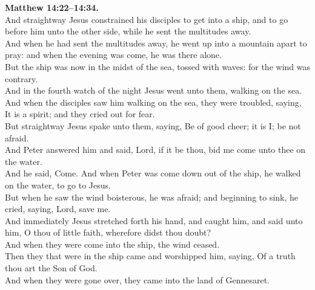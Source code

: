 \documentclass[10pt]{article} %
\begin{document}
{\begin{minipage}[t]{0.45\textwidth}
\textbf{Matthew 14:22--14:34.}\\
And straightway Jesus constrained his disciples to get into a ship, and to go before him unto the other side, while he sent the multitudes away.\\
And when he had sent the multitudes away, he went up into a mountain apart to pray: and when the evening was come, he was there alone.\\
But the ship was now in the midst of the sea, tossed with waves: for the wind was contrary.\\
And in the fourth watch of the night Jesus went unto them, walking on the sea.\\
And when the disciples saw him walking on the sea, they were troubled, saying, It is a spirit; and they cried out for fear.\\
But straightway Jesus spake unto them, saying, Be of good cheer; it is I; be not afraid.\\
And Peter answered him and said, Lord, if it be thou, bid me come unto thee on the water.\\
And he said, Come. And when Peter was come down out of the ship, he walked on the water, to go to Jesus.\\
But when he saw the wind boisterous, he was afraid; and beginning to sink, he cried, saying, Lord, save me.\\
And immediately Jesus stretched forth his hand, and caught him, and said unto him, O thou of little faith, wherefore didst thou doubt?\\
And when they were come into the ship, the wind ceased.\\
Then they that were in the ship came and worshipped him, saying, Of a truth thou art the Son of God.\\
And when they were gone over, they came into the land of Gennesaret.
\end{minipage}}
\vspace*{\fill}
\newpage
\Huge%
\vspace*{\fill}
\end{document}
